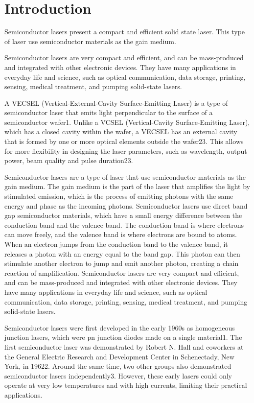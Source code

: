 \chapter{Introduction}\label{chapter:introduction}

Semiconductor lasers present a compact and efficient solid state laser. This type of laser use semiconductor materials as the gain medium. 


Semiconductor lasers are very compact and efficient, and can be mass-produced and integrated with other electronic devices. They have many applications in everyday life and science, such as optical communication, data storage, printing, sensing, medical treatment, and pumping solid-state lasers.

A VECSEL (Vertical-External-Cavity Surface-Emitting Laser) is a type of semiconductor laser that emits light perpendicular to the surface of a semiconductor wafer1. Unlike a VCSEL (Vertical-Cavity Surface-Emitting Laser), which has a closed cavity within the wafer, a VECSEL has an external cavity that is formed by one or more optical elements outside the wafer23. This allows for more flexibility in designing the laser parameters, such as wavelength, output power, beam quality and pulse duration23.

Semiconductor lasers are a type of laser that use semiconductor materials as the gain medium. The gain medium is the part of the laser that amplifies the light by stimulated emission, which is the process of emitting photons with the same energy and phase as the incoming photons. Semiconductor lasers use direct band gap semiconductor materials, which have a small energy difference between the conduction band and the valence band. The conduction band is where electrons can move freely, and the valence band is where electrons are bound to atoms. When an electron jumps from the conduction band to the valence band, it releases a photon with an energy equal to the band gap. This photon can then stimulate another electron to jump and emit another photon, creating a chain reaction of amplification. Semiconductor lasers are very compact and efficient, and can be mass-produced and integrated with other electronic devices. They have many applications in everyday life and science, such as optical communication, data storage, printing, sensing, medical treatment, and pumping solid-state lasers.

Semiconductor lasers were first developed in the early 1960s as homogeneous junction lasers, which were pn junction diodes made on a single material1. The first semiconductor laser was demonstrated by Robert N. Hall and coworkers at the General Electric Research and Development Center in Schenectady, New York, in 19622. Around the same time, two other groups also demonstrated semiconductor lasers independently3. However, these early lasers could only operate at very low temperatures and with high currents, limiting their practical applications.

